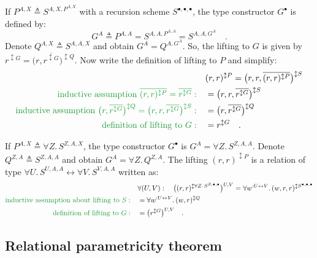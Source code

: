 If $P^{A,X}\triangleq S^{A,X,P^{A,X}}$ with a recursion scheme $S^{\bullet,\bullet,\bullet}$,
the type constructor $G^{\bullet}$ is defined by: 
\[
G^{A}\triangleq P^{A,A}=S^{A,A,P^{A,A}}=S^{A,A,G^{A}}\quad.
\]
Denote $Q^{A,X}\triangleq S^{A,A,X}$ and obtain $G^{A}=Q^{A,G^{A}}$.
So, the lifting to $G$ is given by $r^{\updownarrow G}=\big(r,\overline{r^{\updownarrow G}}\big)^{\updownarrow Q}$.
Now write the definition of lifting to $P$ and simplify:
\begin{align*}
 & (r,r)^{\updownarrow P}=\big(r,r,\overline{(r,r)^{\updownarrow P}}\big)^{\updownarrow S}\\
{\color{greenunder}\text{inductive assumption }\overline{(r,r)^{\updownarrow P}}=\overline{r^{\updownarrow G}}:}\quad & =\big(r,r,\overline{r^{\updownarrow G}}\big)^{\updownarrow S}\\
{\color{greenunder}\text{inductive assumption }\big(r,\overline{r^{\updownarrow G}}\big)^{\updownarrow Q}=\big(r,r,\overline{r^{\updownarrow G}}\big)^{\updownarrow S}:}\quad & =\big(r,\overline{r^{\updownarrow G}}\big)^{\updownarrow Q}\\
{\color{greenunder}\text{definition of lifting to }G:}\quad & =r^{\updownarrow G}\quad.
\end{align*}

If $P^{A,X}\triangleq\forall Z.\,S^{Z,A,X}$, the type constructor
$G^{\bullet}$ is $G^{A}=\forall Z.\,S^{Z,A,A}$. Denote $Q^{Z,A}\triangleq S^{Z,A,A}$
and obtain $G^{A}=\forall Z.\,Q^{Z,A}$. The lifting $(r,r)^{\updownarrow P}$
is a relation of type $\forall U.\,S^{U,A,A}\leftrightarrow\forall V.\,S^{V,A,A}$
written as:
\begin{align*}
 & \forall(U,V):\quad\big((r,r)^{\updownarrow\forall Z.\,S^{Z,\bullet,\bullet}}\big)^{U,V}=\forall w^{:U\leftrightarrow V}.\,(w,r,r)^{\updownarrow S^{\bullet,\bullet,\bullet}}\\
{\color{greenunder}\text{inductive assumption about lifting to }S:}\quad & =\forall w^{:U\leftrightarrow V}.\,(w,r)^{\updownarrow Q}\\
{\color{greenunder}\text{definition of lifting to }G:}\quad & =\big(r^{\updownarrow G}\big)^{U,V}\quad.
\end{align*}


\subsection{Relational parametricity theorem\label{subsec:Relational-parametricity-theorem}}

